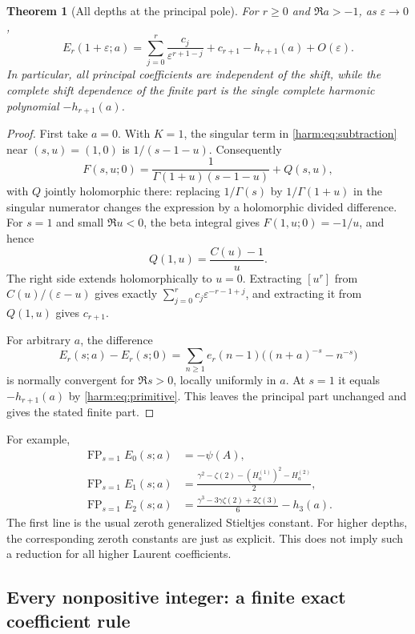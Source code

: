 \documentclass[11pt,letterpaper]{article}
\numberwithin{equation}{section}
\theoremstyle{plain}
\newtheorem{theorem}{Theorem}[section]
\theoremstyle{definition}
\theoremstyle{remark}
\begin{document}
\begin{theorem}[All depths at the principal pole]\label{harm:thm:one}
For $r\geq0$ and $\Re a>-1$, as $\varepsilon\to0$,
\begin{equation}\label{harm:eq:one}
 \boxed{\quad
 E_r(1+\varepsilon;a)
 =\sum_{j=0}^{r}\frac{c_j}{\varepsilon^{r+1-j}}
       +c_{r+1}-h_{r+1}(a)+O(\varepsilon).
 \quad}
\end{equation}
In particular, all principal coefficients are independent of the
shift, while the complete shift dependence of the finite part is
the single complete harmonic polynomial $-h_{r+1}(a)$.
\end{theorem}
\begin{proof}
First take $a=0$.  With $K=1$, the singular term in
\eqref{harm:eq:subtraction} near $(s,u)=(1,0)$ is $1/(s-1-u)$.
Consequently
\[
 F(s,u;0)=\frac{1}{\Gamma(1+u)(s-1-u)}+Q(s,u),
\]
with $Q$ jointly holomorphic there: replacing $1/\Gamma(s)$ by
$1/\Gamma(1+u)$ in the singular numerator changes the expression
by a holomorphic divided difference.  For $s=1$ and small
$\Re u<0$, the beta integral gives $F(1,u;0)=-1/u$, and hence
\[
 Q(1,u)=\frac{C(u)-1}{u}.
\]
The right side extends holomorphically to $u=0$.  Extracting
$[u^r]$ from $C(u)/(\varepsilon-u)$ gives exactly
$\sum_{j=0}^{r}c_j\varepsilon^{-r-1+j}$, and extracting it from
$Q(1,u)$ gives $c_{r+1}$.

For arbitrary $a$, the difference
\[
 E_r(s;a)-E_r(s;0)
   =\sum_{n\geq1}e_r(n-1)
               \bigl((n+a)^{-s}-n^{-s}\bigr)
\]
is normally convergent for $\Re s>0$, locally uniformly in $a$.
At $s=1$ it equals $-h_{r+1}(a)$ by
\eqref{harm:eq:primitive}.  This leaves the principal part unchanged
and gives the stated finite part.
\end{proof}

For example,
\begin{align}
 \operatorname{FP}_{s=1}E_0(s;a)&=-\psi(A),\\
 \operatorname{FP}_{s=1}E_1(s;a)
 &=\frac{\gamma^2-\zeta(2)-(H_a^{(1)})^2-H_a^{(2)}}2,\\
 \operatorname{FP}_{s=1}E_2(s;a)
 &=\frac{\gamma^3-3\gamma\zeta(2)+2\zeta(3)}6-h_3(a).
\end{align}
The first line is the usual zeroth generalized Stieltjes constant.
For higher depths, the corresponding zeroth constants are just as
explicit.  This does not imply such a reduction for all higher
Laurent coefficients.

\subsection{Every nonpositive integer: a finite exact coefficient rule}
\end{document}
